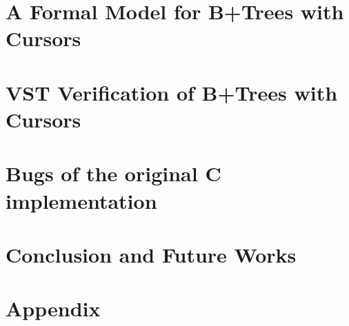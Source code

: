 \documentclass{llncs2e/llncs}
\begin{document}
\section{A Formal Model for B+Trees with Cursors}
\label{sec:model}


\section{VST Verification of B+Trees with Cursors}
\label{sec:verif}


\section{Bugs of the original C implementation}
\label{sec:bugs}


\section{Conclusion and Future Works}
\label{sec:conclusion}


\newpage
{}
\nocite{*}



\section{Appendix}
\label{sec:appendix}

\end{document}
